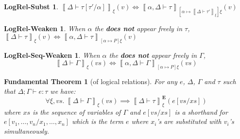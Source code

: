 \documentclass{article}
\newcommand{\pred}{P}
\newcommand{\semtyp}[3]{\left\llbracket #2 \vdash #3 \right\rrbracket_{#1}}
\newcommand{\semErel}[1]{#1^{\textbf{E}}}
\newcommand{\semenv}{\xi}
\newcommand{\Tctx}{\Gamma}
\newcommand{\CtxTps}{\Delta}
\newcommand{\expr}{e}
\newcommand{\val}{v}
\newcommand{\var}{x}
\newcommand{\typ}{\tau}
\newcommand{\tvar}{\alpha}
\newcommand{\typed}[4]{#1; #2 \vdash #3 : #4}
\begin{document}
\newtheorem*{logrelsubst}{LogRel-Subst}
\begin{logrelsubst}
  \makeatletter{}\makeatother
  \label{lem:logrelsubst}
  $\semtyp{\semenv}{\CtxTps}{\typ[\typ'/\tvar]}(\val) \iff \semtyp{[\tvar \mapsto \semtyp{\semenv}{\CtxTps}{\typ'}]\semenv}{\tvar, \CtxTps}{\typ}(\val)$
\end{logrelsubst}

\newtheorem*{logrelweaken}{LogRel-Weaken}
\begin{logrelweaken}
  \makeatletter{}\makeatother
  \label{lem:logrelweaken}
  When $\tvar$ the \textbf{does not} appear freely in $\typ$,
  $\semtyp{\semenv}{\CtxTps}{\typ}(\val) \iff \semtyp{[\tvar \mapsto \pred]\semenv}{\tvar, \CtxTps}{\typ}(\val)$
\end{logrelweaken}
\newtheorem*{logrelseqweaken}{LogRel-Seq-Weaken}
\begin{logrelseqweaken}
  \makeatletter{}\makeatother
  \label{lem:logrelseqweaken}
  When $\tvar$ the \textbf{does not} appear freely in $\Tctx$,
  \[ \semtyp{\semenv}{\CtxTps}{\Tctx}(\mathit{vs}) \iff \semtyp{[\tvar \mapsto \pred]\semenv}{\tvar, \CtxTps}{\Tctx}(\mathit{vs}) \]
\end{logrelseqweaken}

\newtheorem*{fundamentaltheorem}{Fundamental Theorem}

\begin{fundamentaltheorem}[of logical relations]
  \makeatletter{}\makeatother
  \label{thm:fundamental}
For any $e$, $\CtxTps$, $\Tctx$ and $\typ$ such that $\typed{\CtxTps}{\Tctx}{\expr}{\typ}$ we have:
\[
\forall \semenv, \mathit{vs}. ~\semtyp{\semenv}{\CtxTps}{\Tctx}(\mathit{vs}) \implies
\semErel{\semtyp{\semenv}{\CtxTps}{\typ}}(\expr[\mathit{vs}/\mathit{xs}])
\]
where $\mathit{xs}$ is the sequence of variables of $\Tctx$ and $\expr[\mathit{vs}/\mathit{xs}]$ is a shorthand for $\expr[\val_1, \dots, \val_n/\var_1, \dots, \var_n]$ which is the term $\expr$ where $\var_i$'s are substituted with $\val_i$'s simultaneously.
\end{fundamentaltheorem}
\end{document}
